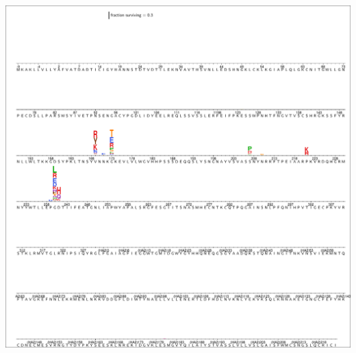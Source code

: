 \documentclass[11pt]{article}
\begin{document}
\begin{suppfigure}
\centerline{\includegraphics[trim=0.1cm 0.02cm 0.1cm 0.03cm,clip=true,width=\textwidth]{figs/logoplots/H17L10_fracsurvive.pdf}}
\caption{\label{suppfig:H17L10logo}
{\bf The excess fraction surviving selection with antibody H17L10 for all amino-acid mutations.}
The excess fraction surviving for each replicate was computed using Equation~\ref{eq:fracsurvive_excess}, then we took the median across all technical and biological replicates for each antibody concentration, and then took the medians of those values across concentrations.
The height of each letter is proportional to the excess fraction surviving of virions with that mutation.
The scale bar at the top of the plot relates the letter heights to the actual fractions.
The sites are labeled using H3 numbering.
}
\end{suppfigure}
\end{document}
